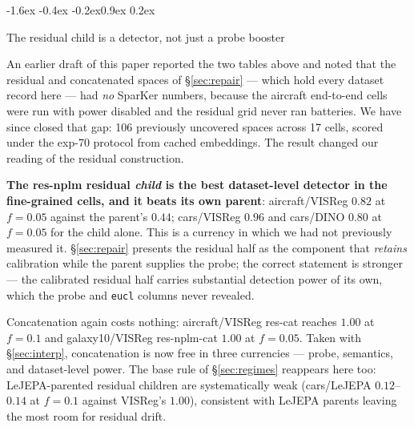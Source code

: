 \documentclass{article}
\makeatletter
\renewcommand\subsection{\@startsection{subsection}{2}{\z@}%
  {-1.6ex \@plus -0.4ex \@minus -0.2ex}{0.9ex \@plus 0.2ex}%
  {\normalsize\bf\raggedright}}
\makeatother
\begin{document}
\subsection{The residual child is a detector, not just a probe booster}
\label{sec:residual-detector}

An earlier draft of this paper reported the two tables above and noted that the
residual and concatenated spaces of \S\ref{sec:repair} --- which hold every
dataset record here --- had \emph{no} SparKer numbers, because the aircraft
end-to-end cells were run with power disabled and the residual grid never ran
batteries. We have since closed that gap: 106 previously uncovered spaces
across 17 cells, scored under the exp-70 protocol from cached embeddings. The
result changed our reading of the residual construction.

\textbf{The res-nplm residual \emph{child} is the best dataset-level detector in
the fine-grained cells, and it beats its own parent}: aircraft/VISReg
$0.82$ at $f{=}0.05$ against the parent's $0.44$; cars/VISReg $0.96$ and
cars/DINO $0.80$ at $f{=}0.05$ for the child alone. This is a currency in which
we had not previously measured it. \S\ref{sec:repair} presents the residual half
as the component that \emph{retains} calibration while the parent supplies the
probe; the correct statement is stronger --- the calibrated residual half
carries substantial detection power of its own, which the probe and \texttt{eucl}
columns never revealed.

Concatenation again costs nothing: aircraft/VISReg res-cat reaches $1.00$ at
$f{=}0.1$ and galaxy10/VISReg res-nplm-cat $1.00$ at $f{=}0.05$. Taken with
\S\ref{sec:interp}, concatenation is now free in three currencies --- probe,
semantics, and dataset-level power. The base rule of \S\ref{sec:regimes}
reappears here too: LeJEPA-parented residual children are systematically weak
(cars/LeJEPA $0.12$--$0.14$ at $f{=}0.1$ against VISReg's $1.00$), consistent
with LeJEPA parents leaving the most room for residual drift.
\end{document}
